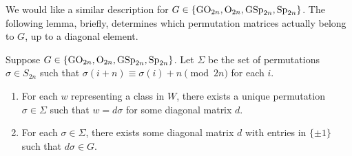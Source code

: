 We would like a similar description for $G\in\{\mathrm{GO}_{2n},\mathrm{O}_{2n},\mathrm{GSp}_{2n},\mathrm{Sp}_{2n}\}$. The following lemma, briefly, determines which permutation matrices actually belong to $G$, up to a diagonal element.
\begin{lemma} \label{lem:weyl-normal-form}
    Suppose $G\in\{\mathrm{GO}_{2n},\mathrm{O}_{2n},\mathrm{GSp}_{2n},\mathrm{Sp}_{2n}\}$. Let $\Sigma$ be the set of permutations $\sigma\in S_{2n}$ such that $\sigma(i+n)\equiv\sigma(i)+n\pmod{2n}$ for each $i$.
    \begin{enumerate}[label=(\alph*)]
        \item For each $w$ representing a class in $W$, there exists a unique permutation $\sigma\in\Sigma$ such that $w=d\sigma$ for some diagonal matrix $d$.
        \item For each $\sigma\in\Sigma$, there exists some diagonal matrix $d$ with entries in $\{\pm1\}$ such that $d\sigma\in G$.%
    \end{enumerate}
\end{lemma}
